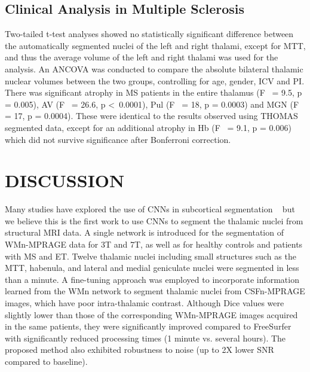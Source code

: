 \subsection{Clinical Analysis in Multiple Sclerosis}Two-tailed t-test analyses showed no statistically significant difference between the automatically segmented nuclei of the left and right thalami, except for MTT, and thus the average volume of the left and right thalami was used for the analysis. An ANCOVA was conducted to compare the absolute bilateral thalamic nuclear volumes between the two groups, controlling for age, gender, ICV and PI. There was significant atrophy in MS patients in the entire thalamus (F\unskip~\cite{1643371:26789934,1643371:26789933} = 9.5, p = 0.005), AV (F\unskip~\cite{1643371:26789934,1643371:26789933} = 26.6, p \textless\ 0.0001), Pul (F\unskip~\cite{1643371:26789934,1643371:26789933} = 18, p = 0.0003) and MGN (F\unskip~\cite{1643371:26789934,1643371:26789933} = 17, p = 0.0004). These were identical to the results observed using THOMAS segmented data, except for an additional atrophy in Hb (F\unskip~\cite{1643371:26789934,1643371:26789933} = 9.1, p = 0.006) which did not survive significance after Bonferroni correction.
    
\section{DISCUSSION}
Many studies have explored the use of CNNs in subcortical segmentation \unskip~\cite{1643371:26789955,1643371:26789913,1643371:26789947,1643371:26789902} but we believe this is the first work to use CNNs to segment the thalamic nuclei from structural MRI data. A single network is introduced for the segmentation of WMn-MPRAGE data for 3T and 7T, as well as for healthy controls and patients with MS and ET. Twelve thalamic nuclei including small structures such as the MTT, habenula, and lateral and medial geniculate nuclei were segmented in less than a minute. A fine-tuning approach was employed to incorporate information learned from the WMn network to segment thalamic nuclei from CSFn-MPRAGE images, which have poor intra-thalamic contrast. Although Dice values were slightly lower than those of the corresponding WMn-MPRAGE images acquired in the same patients, they were significantly improved compared to FreeSurfer with significantly reduced processing times (1 minute vs. several hours). The proposed method also exhibited robustness to noise (up to 2X lower SNR compared to baseline). 

